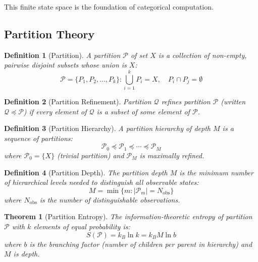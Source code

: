 \documentclass[twocolumn,10pt]{article}
\newtheorem{theorem}{Theorem}
\newtheorem{definition}{Definition}
\begin{document}
This finite state space is the foundation of categorical computation.

\subsection{Partition Theory}

\begin{definition}[Partition]
A partition $\mathcal{P}$ of set $X$ is a collection of non-empty, pairwise disjoint subsets whose union is $X$:
\begin{equation}
\mathcal{P} = \{P_1, P_2, \ldots, P_k\} : \bigcup_{i=1}^k P_i = X, \quad P_i \cap P_j = \emptyset
\end{equation}
\end{definition}

\begin{definition}[Partition Refinement]
Partition $\mathcal{Q}$ refines partition $\mathcal{P}$ (written $\mathcal{Q} \preceq \mathcal{P}$) if every element of $\mathcal{Q}$ is a subset of some element of $\mathcal{P}$.
\end{definition}

\begin{definition}[Partition Hierarchy]
A partition hierarchy of depth $M$ is a sequence of partitions:
\begin{equation}
\mathcal{P}_0 \preceq \mathcal{P}_1 \preceq \cdots \preceq \mathcal{P}_M
\end{equation}
where $\mathcal{P}_0 = \{X\}$ (trivial partition) and $\mathcal{P}_M$ is maximally refined.
\end{definition}

\begin{definition}[Partition Depth]
The partition depth $M$ is the minimum number of hierarchical levels needed to distinguish all observable states:
\begin{equation}
M = \min\{m : |\mathcal{P}_m| = N_{\text{obs}}\}
\end{equation}
where $N_{\text{obs}}$ is the number of distinguishable observations.
\end{definition}

\begin{theorem}[Partition Entropy]
\label{thm:partition_entropy}
The information-theoretic entropy of partition $\mathcal{P}$ with $k$ elements of equal probability is:
\begin{equation}
S(\mathcal{P}) = k_B \ln k = k_B M \ln b
\end{equation}
where $b$ is the branching factor (number of children per parent in hierarchy) and $M$ is depth.
\end{theorem}
\end{document}
